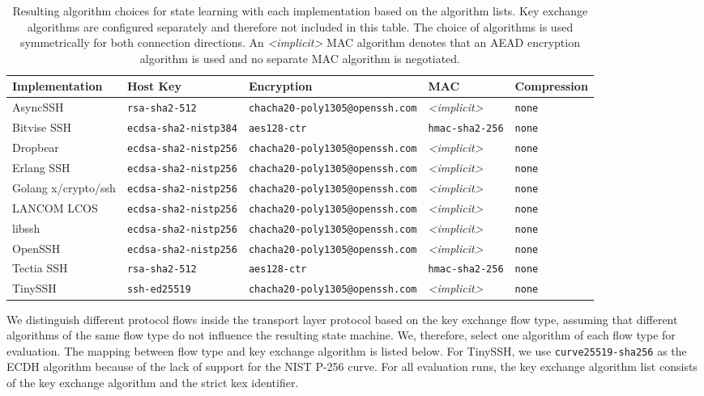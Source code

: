 \documentclass[sigconf,nonacm]{acmart}
\begin{document}
\begin{table*}[h]
    \centering
    \caption{Resulting algorithm choices for state learning with each implementation based on the algorithm lists. Key exchange algorithms are configured separately and therefore not included in this table. The choice of algorithms is used symmetrically for both connection directions. An \textit{<implicit>} MAC algorithm denotes that an AEAD encryption algorithm is used and no separate MAC algorithm is negotiated.}
    \label{tab}
    \begin{tabular}{lllll}
        \toprule
        Implementation & Host Key & Encryption & MAC & Compression \\
        \midrule
        AsyncSSH & \texttt{rsa-sha2-512} & \texttt{chacha20-poly1305@openssh.com} & \textit{<implicit>} & \texttt{none} \\
        Bitvise SSH & \texttt{ecdsa-sha2-nistp384} & \texttt{aes128-ctr} & \texttt{hmac-sha2-256} & \texttt{none} \\
        Dropbear & \texttt{ecdsa-sha2-nistp256} & \texttt{chacha20-poly1305@openssh.com} & \textit{<implicit>} & \texttt{none} \\
        Erlang SSH & \texttt{ecdsa-sha2-nistp256} & \texttt{chacha20-poly1305@openssh.com} & \textit{<implicit>} & \texttt{none} \\
        Golang x/crypto/ssh & \texttt{ecdsa-sha2-nistp256} & \texttt{chacha20-poly1305@openssh.com} & \textit{<implicit>} & \texttt{none} \\
        LANCOM LCOS & \texttt{ecdsa-sha2-nistp256} & \texttt{chacha20-poly1305@openssh.com} & \textit{<implicit>} & \texttt{none} \\
        libssh & \texttt{ecdsa-sha2-nistp256} & \texttt{chacha20-poly1305@openssh.com} & \textit{<implicit>} & \texttt{none} \\
        OpenSSH & \texttt{ecdsa-sha2-nistp256} & \texttt{chacha20-poly1305@openssh.com} & \textit{<implicit>} & \texttt{none} \\
        Tectia SSH & \texttt{rsa-sha2-512} & \texttt{aes128-ctr} & \texttt{hmac-sha2-256} & \texttt{none} \\
        TinySSH & \texttt{ssh-ed25519} & \texttt{chacha20-poly1305@openssh.com} & \textit{<implicit>} & \texttt{none} \\
        \bottomrule 
    \end{tabular}
\end{table*}

We distinguish different protocol flows inside the transport layer protocol based on the key exchange flow type, assuming that different algorithms of the same flow type do not influence the resulting state machine. We, therefore, select one algorithm of each flow type for evaluation. The mapping between flow type and key exchange algorithm is listed below. For TinySSH, we use \texttt{curve25519-sha256} as the ECDH algorithm because of the lack of support for the NIST P-256 curve. For all evaluation runs, the key exchange algorithm list consists of the key exchange algorithm and the strict kex identifier.
\end{document}
